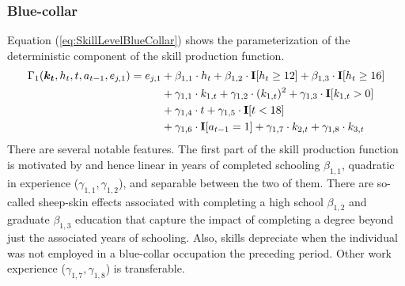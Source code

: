 \subsubsection*{Blue-collar}
Equation (\ref{eq:SkillLevelBlueCollar}) shows the parameterization of the deterministic component of the skill production function.
%
\begin{align}\label{eq:SkillLevelBlueCollar}
    \Gamma_1(\bm{k_t}, h_t, t, a_{t-1}, e_{j, 1}) = e_{j,1} & + \beta_{1,1} \cdot h_t + \beta_{1, 2} \cdot {\textbf{I}}[h_t \geq 12] + \beta_{1,3} \cdot {\textbf{I}}[h_t\geq 16]\\ \nonumber
                                  & + \gamma_{1, 1} \cdot  k_{1,t} + \gamma_{1,2} \cdot  (k_{1,t})^2 + \gamma_{1,3} \cdot  {\textbf{I}}[k_{1,t} > 0] \\ \nonumber
                                & + \gamma_{1,4} \cdot  t + \gamma_{1,5} \cdot {\textbf{I}}[t < 18]\\ \nonumber
                                  & + \gamma_{1,6} \cdot {\textbf{I}}[a_{t-1} = 1] + \gamma_{1,7} \cdot  k_{2,t} + \gamma_{1,8} \cdot  k_{3,t} \nonumber
\end{align}
%
There are several notable features. The first part of the skill production function is motivated by \citet{Mincer.1958, Mincer.1974} and hence linear in years of completed schooling $\beta_{1,1}$, quadratic in experience ($\gamma_{1,1}, \gamma_{1,2}$), and separable between the two of them. There are so-called sheep-skin effects \citep{Spence.1973, Jaeger.1996} associated with completing a high school $\beta_{1,2}$ and graduate $\beta_{1,3}$ education that capture the impact of completing a degree beyond just the associated years of schooling. Also, skills depreciate when the individual was not employed in a blue-collar occupation the preceding period. Other work experience ($\gamma_{1,7}, \gamma_{1,8}$) is transferable.
